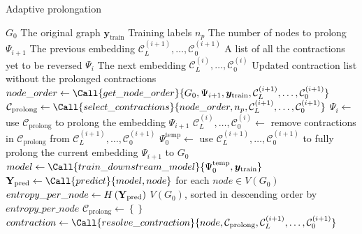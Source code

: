 \documentclass[sn-mathphys,pdflatex,iicol]{sn-jnl}%
\newcommand{\mathmat}{\ensuremath{\mathbf}}
\begin{document}
\begin{algorithm*}
  \caption{Adaptive prolongation}
  \label{alg:adaptive-prolongation}
  \begin{algorithmic}
    \Require $ G_0 $ \Comment The original graph
    \Require $ \bm{y}_\mathrm{train} $ \Comment Training labels
    \Require $ n_p $ \Comment The number of nodes to prolong
    \Require $ \Psi_{i + 1} $ \Comment The previous embedding
    \Require $ \mathcal{C}_L^{(i + 1)}, \dots, \mathcal{C}_0^{(i + 1)} $ \Comment A list of all the contractions yet to be reversed
    \Ensure $ \Psi_i $ \Comment The next embedding
    \Ensure $ \mathcal{C}_L^{(i)}, \dots, \mathcal{C}_0^{(i)} $ \Comment Updated contraction list without the prolonged contractions
    \Statex
    \State $ node\_order \gets \Call{get\_node\_order}{G_0, \Psi_{i+1}, \bm{y}_\mathrm{train}, \mathcal{C}_L^{(i + 1)}, \dots, \mathcal{C}_0^{(i + 1)}} $
    \State $ \mathcal{C}_\mathrm{prolong} \gets \Call{select\_contractions}{node\_order, n_p, \mathcal{C}_L^{(i + 1)}, \dots, \mathcal{C}_0^{(i + 1)}} $
    \State $ \Psi_i \gets $ use $ \mathcal{C}_\mathrm{prolong} $ to prolong the embedding $ \Psi_{i + 1} $
    \State $ \mathcal{C}_L^{(i)}, \dots, \mathcal{C}_0^{(i)} \gets $ remove contractions in $ \mathcal{C}_\mathrm{prolong} $ from $ \mathcal{C}_L^{(i + 1)}, \dots, \mathcal{C}_0^{(i + 1)} $
    \Statex
        \State $ \Psi_0^\mathrm{temp} \gets $ use $ \mathcal{C}_L^{(i + 1)}, \dots, \mathcal{C}_0^{(i + 1)} $ to fully prolong the current embedding $ \Psi_{i+1} $ to $ G_0 $
        \State $ model \gets \Call{train\_downstream\_model}{\Psi_0^\mathrm{temp}, \bm{y}_\mathrm{train}} $
        \State $ \mathmat{Y}_\mathrm{pred} \gets \Call{predict}{model, node} $ for each $ node \in V \left( G_0 \right) $
        \State $ entropy\_per\_node \gets H \left( \mathmat{Y}_\mathrm{pred} \right) $
        \State \Return $ V \left( G_0 \right) $, sorted in descending order by $ entropy\_per\_node $
    \EndFunction
    \Statex
        \State $ \mathcal{C}_\mathrm{prolong} \gets \left\{ \right\} $
            \State $ contraction \gets \Call{resolve\_contraction}{node, \mathcal{C}_\mathrm{prolong}, \mathcal{C}_L^{(i + 1)}, \dots, \mathcal{C}_0^{(i + 1)}} $

\end{algorithmic}
\end{algorithm*}
\end{document}
